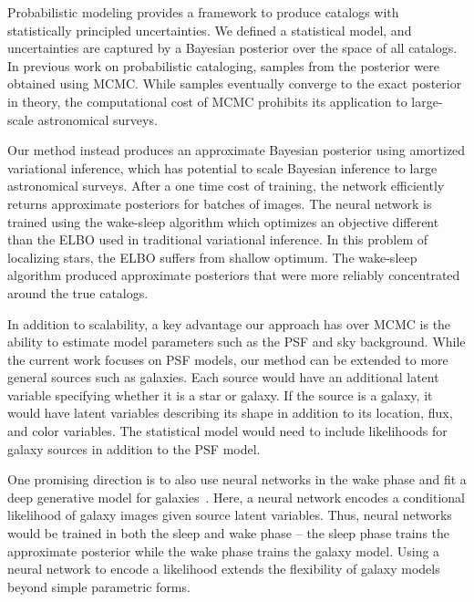 Probabilistic modeling provides a framework to 
produce catalogs with statistically principled uncertainties.
We defined a statistical model, and uncertainties are captured by a Bayesian posterior over the space of all catalogs.
In previous work on probabilistic cataloging, samples from the posterior were obtained using MCMC. 
While samples eventually converge to the exact posterior in theory, the computational cost of MCMC prohibits its application to large-scale astronomical surveys. 

Our method instead produces an approximate Bayesian posterior using amortized variational inference, which has potential to scale Bayesian inference to large astronomical surveys.
After a one time cost of training, the network efficiently returns approximate posteriors for batches of images.
The neural network is trained using the wake-sleep algorithm which optimizes an objective different than the ELBO used in traditional variational inference. 
In this problem of localizing stars, 
the ELBO suffers from shallow optimum. 
The wake-sleep algorithm produced approximate posteriors that were more reliably concentrated around the true catalogs. 

In addition to scalability, a key advantage our approach has over MCMC is the ability to estimate model parameters such as the PSF and sky background.
While the current work focuses on PSF models, our method can be extended to more general sources such as galaxies.
Each source would have an additional latent variable specifying whether it is a star or galaxy. If the source is a galaxy, it would have latent variables describing its shape in addition to its location, flux, and color variables. The statistical model would need to include likelihoods for galaxy sources in addition to the PSF model.

One promising direction is to also use neural networks in the wake phase and fit a deep generative model for galaxies~\cite{Regier2015ADG}. Here, a neural network encodes a conditional likelihood of galaxy images given source latent variables. Thus, neural networks would be trained in both the sleep and wake phase -- the sleep phase trains the approximate posterior while the wake phase trains the galaxy model. Using a neural network to encode a likelihood extends the flexibility of galaxy models beyond simple parametric forms. 

